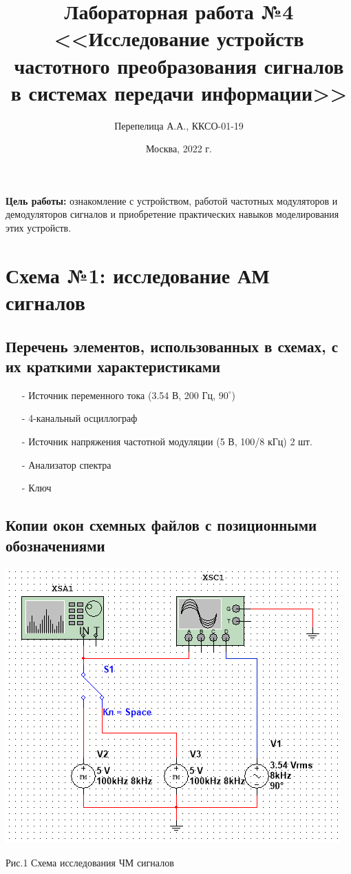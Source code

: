\documentclass[11pt]{article}
\title{\textbf{Лабораторная работа №4\\<<Исследование устройств частотного преобразования сигналов в системах передачи информации>>}}
\author{Перепелица А.А., ККСО-01-19}
\date{Москва, 2022 г.}
\begin{document}
\maketitle
\thispagestyle{empty}
\textbf{Цель работы:} ознакомление с устройством, работой частотных 
модуляторов и демодуляторов сигналов и приобретение практических навыков 
моделирования этих устройств. 

\section{Схема №1: исследование АМ сигналов}
\subsection{Перечень элементов, использованных в схемах, с
их краткими характеристиками}
\begin{itemize}
    \item[-] Источник переменного тока (3.54 В, 200 Гц, $90^\circ$)
    \item[-] 4-канальный осциллограф
    \item[-] Источник напряжения частотной модуляции (5 В, 100/8 кГц) 2 шт.
    \item[-] Анализатор спектра 
    \item[-] Ключ
\end{itemize}


\subsection{Копии окон схемных файлов с позиционными обозначениями}
\includegraphics[width=1\linewidth]{img/scheme1.png}
\begin{center}
    Рис.1 Схема исследования ЧМ сигналов
\end{center}
\end{document}
